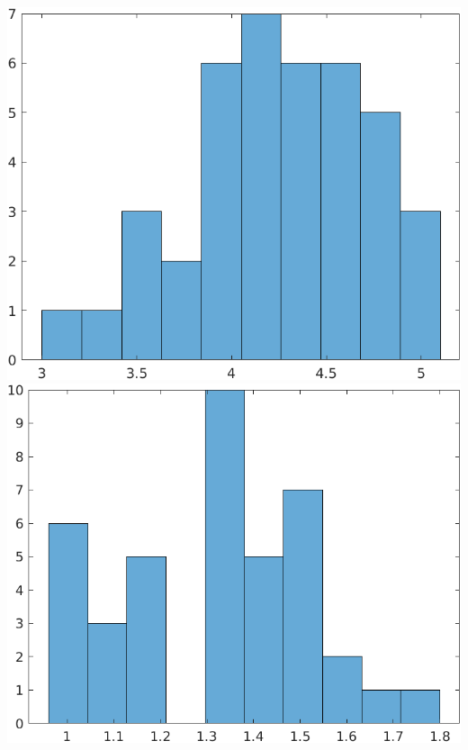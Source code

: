 \documentclass[a4paper]{scrartcl}
\begin{document}
\begin{itemize}
		\includegraphics*[scale=0.2]{assignment2_data/plots/versicolor_pl.png}
		\includegraphics*[scale=0.2]{assignment2_data/plots/versicolor_pb.png}\ \\
		

\end{itemize}
\end{document}
